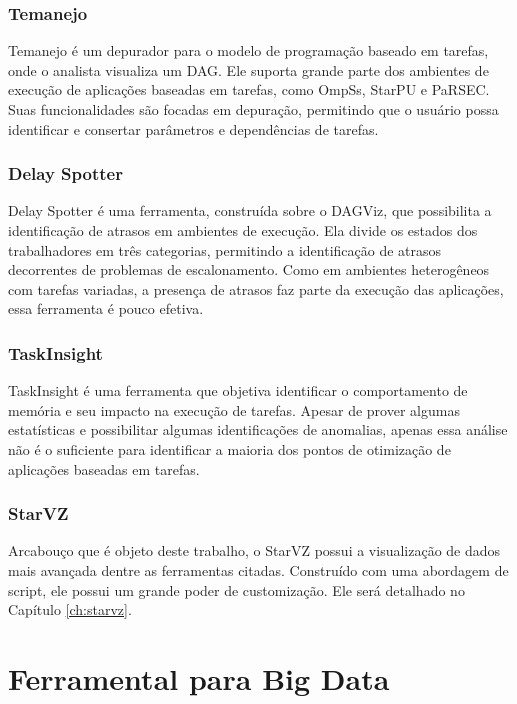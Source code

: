 \subsubsection*{Temanejo}

Temanejo \cite{ref:temanejo} é um depurador para o modelo de 
programação baseado em tarefas, onde o analista visualiza um DAG. Ele suporta 
grande parte dos ambientes de execução de aplicações baseadas em tarefas, como 
OmpSs, StarPU e PaRSEC. Suas funcionalidades são focadas em depuração, 
permitindo que o usuário possa identificar e consertar parâmetros e dependências 
de tarefas.

\subsubsection*{Delay Spotter}

Delay Spotter \cite{ref:delayspotter} é uma ferramenta, construída sobre o 
DAGViz, que possibilita a identificação de atrasos em ambientes 
de execução. Ela divide os estados dos trabalhadores em três categorias, 
permitindo a identificação de atrasos decorrentes de problemas de 
escalonamento. Como em ambientes heterogêneos com tarefas variadas, a presença 
de atrasos faz parte da execução das aplicações, essa ferramenta é 
pouco efetiva.

\subsubsection*{TaskInsight}

TaskInsight \cite{ref:taskinsight} é uma ferramenta que objetiva identificar o 
comportamento de memória e seu impacto na execução de tarefas. Apesar de prover 
algumas estatísticas e possibilitar algumas identificações de anomalias, apenas 
essa análise não é o suficiente para identificar a maioria dos pontos de 
otimização de aplicações baseadas em tarefas.

\subsubsection*{StarVZ}

Arcabouço que é objeto deste trabalho, o StarVZ \cite{ref:starvz} possui 
a visualização de dados mais avançada dentre as ferramentas citadas. Construído 
com uma abordagem de script, ele possui um grande poder de 
customização. Ele será detalhado no Capítulo \ref{ch:starvz}.

\section{Ferramental para Big Data}

